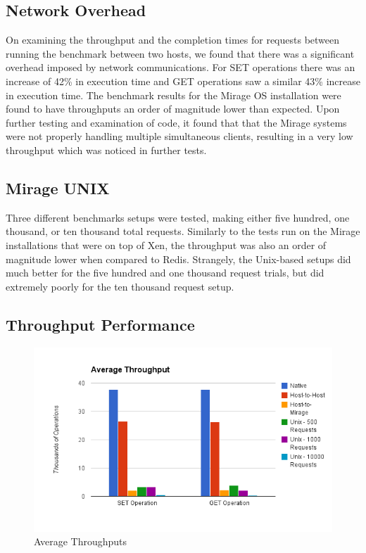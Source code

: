 \documentclass[english,10pt,twocolumn]{article}
\begin{document}
\subsection{Network Overhead}

On examining the throughput and the completion times for requests between running the benchmark between two hosts, we found that there was a significant overhead imposed by network communications. For SET operations there was an increase of 42\% in execution time and GET operations saw a similar 43\% increase in execution time.
The benchmark results for the Mirage OS installation were found to have throughputs an order of magnitude lower than expected.
Upon further testing and examination of code, it found that that the Mirage systems were not properly handling multiple simultaneous clients, resulting in a very low throughput which was noticed in further tests.


\subsection{Mirage \- UNIX}

Three different benchmarks setups were tested, making either five hundred, one thousand, or ten thousand total requests.
Similarly to the tests run on the Mirage installations that were on top of Xen, the throughput was also an order of magnitude lower when compared to Redis. 
Strangely, the Unix-based setups did much better for the five hundred and one thousand request trials, but did extremely poorly for the ten thousand request setup.

\subsection{Throughput Performance}

\begin{figure}[ht]
  \centering
  \caption{Average Throughputs}
  \includegraphics[width=1.0\textwidth]{images/throughput}
\end{figure}
\end{document}
